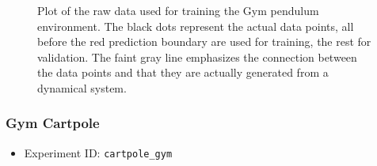 \begin{figure}
				\caption{Plot of the raw data used for training the Gym pendulum environment. The black dots represent the actual data points, all before the red prediction boundary are used for training, the rest for validation. The faint gray line emphasizes the connection between the data points and that they are actually generated from a dynamical system.}
				\label{fig:envPendulumGym}
			\end{figure}

		\subsubsection{Gym Cartpole}
			\label{subsubsec:cartpole}

			\begin{itemize}
				\item Experiment ID: \texttt{cartpole\_gym}
			\end{itemize}

